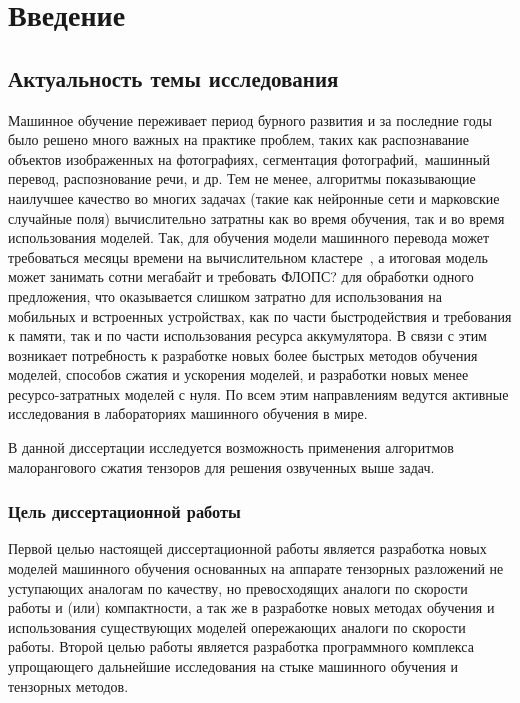 \chapter*{Введение}							%

\section{Актуальность темы исследования} \label{sec:intro-importance}
Машинное обучение переживает период бурного развития и за последние годы было решено много важных на практике проблем, таких как распознавание объектов изображенных на фотографиях, сегментация фотографий, машинный перевод, распознование речи, и др. Тем не менее, алгоритмы показывающие наилучшее качество во многих задачах (такие как нейронные сети и марковские случайные поля) вычислительно затратны как во время обучения, так и во время использования моделей. Так, для обучения модели машинного перевода может требоваться месяцы времени на вычислительном кластере~\cite{}, а итоговая модель может занимать сотни мегабайт и требовать \alert{ФЛОПС?} для обработки одного предложения, что оказывается слишком затратно для использования на мобильных и встроенных устройствах, как по части быстродействия и требования к памяти, так и по части использования ресурса аккумулятора. В связи с этим возникает потребность к разработке новых более быстрых методов обучения моделей, способов сжатия и ускорения моделей, и разработки новых менее ресурсо-затратных моделей с нуля. По всем этим направлениям ведутся активные исследования в лабораториях машинного обучения в мире.

В данной диссертации исследуется возможность применения алгоритмов малорангового сжатия тензоров для решения озвученных выше задач. 
\subsection{Цель диссертационной работы}
Первой целью настоящей диссертационной работы является разработка новых моделей машинного обучения основанных на аппарате тензорных разложений не уступающих аналогам по качеству, но превосходящих аналоги по скорости работы и (или) компактности, а так же в разработке новых методах обучения и использования существующих моделей опережающих аналоги по скорости работы. Второй целью работы является разработка программного комплекса упрощающего дальнейшие исследования на стыке машинного обучения и тензорных методов.

